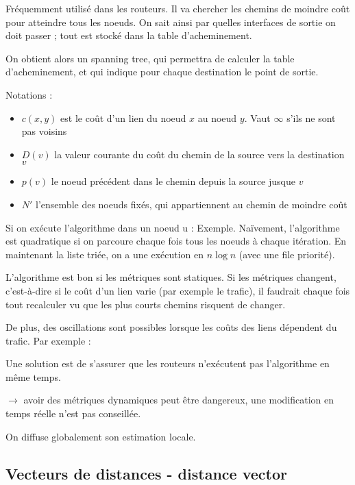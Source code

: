 		Fréquemment utilisé dans les routeurs. Il va chercher les chemins de moindre coût pour atteindre tous les noeuds. On sait ainsi par quelles interfaces de sortie on doit passer ; tout est stocké dans la table d'acheminement.
				
		On obtient alors un spanning tree, qui permettra de calculer la table d'acheminement, et qui indique pour chaque destination le point de sortie.
		
		Notations : 
		\begin{itemize}
			\item $c(x, y)$ est le coût d'un lien du noeud $x$ au noeud $y$. Vaut $\infty$ s'ils ne sont pas voisins 				\item $D(v)$ la valeur courante du coût du chemin de la source vers la destination $v$ 				 				\item $p(v)$ le noeud précédent dans le chemin depuis la source jusque $v$ 				\item $N'$ l'ensemble des noeuds fixés, qui appartiennent au chemin de moindre coût 			\end{itemize} 			 			Si on exécute l'algorithme dans un noeud u : 			\dessin{79} 			 			Exemple. 						 			\dessin{80} 			 			Naïvement, l'algorithme est quadratique si on parcoure chaque fois tous les noeuds à chaque itération. En maintenant la liste triée, on a une exécution en $n \log n$ (avec une file  priorité).

		L'algorithme est bon si les métriques sont statiques. Si les métriques changent, c'est-à-dire si le coût d'un lien varie (par exemple le trafic), il faudrait chaque fois tout recalculer vu que les plus courts chemins risquent de changer. 
		
		De plus, des oscillations sont possibles lorsque les coûts des liens dépendent du trafic. Par exemple :
		
		
		Une solution est de s'assurer que les routeurs n'exécutent pas l'algorithme en même temps.
		
		$\rightarrow$ avoir des métriques dynamiques peut être dangereux, une modification en temps réelle n'est pas conseillée.
		
		On diffuse globalement son estimation locale.
		
		
	\subsection{Vecteurs de distances - distance vector}
	
